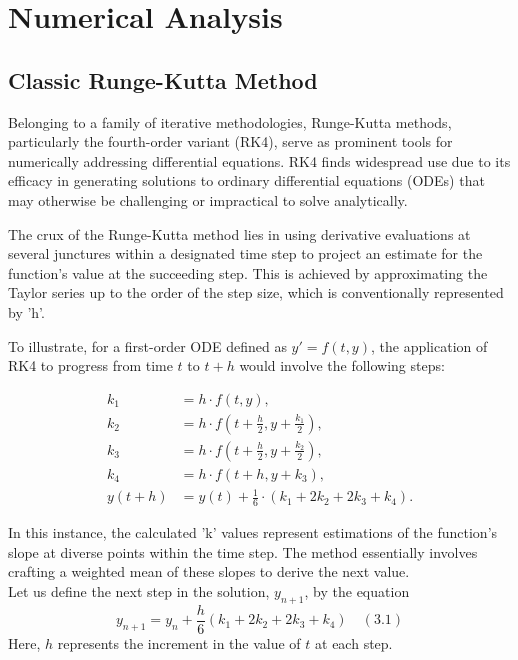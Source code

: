 \section{Numerical Analysis}
\subsection{Classic Runge-Kutta Method}

Belonging to a family of iterative methodologies, Runge-Kutta methods, particularly the fourth-order variant (RK4), serve as prominent tools for numerically addressing differential equations. RK4 finds widespread use due to its efficacy in generating solutions to ordinary differential equations (ODEs) that may otherwise be challenging or impractical to solve analytically.

The crux of the Runge-Kutta method lies in using derivative evaluations at several junctures within a designated time step to project an estimate for the function's value at the succeeding step. This is achieved by approximating the Taylor series up to the order of the step size, which is conventionally represented by 'h'.

To illustrate, for a first-order ODE defined as $y' = f(t, y)$, the application of RK4 to progress from time $t$ to $t + h$ would involve the following steps:

\begin{equation}
\begin{aligned}
k_1 &= h \cdot f(t, y), \\
k_2 &= h \cdot f(t + \frac{h}{2}, y + \frac{k_1}{2}), \\
k_3 &= h \cdot f(t + \frac{h}{2}, y + \frac{k_2}{2}), \\
k_4 &= h \cdot f(t + h, y + k_3), \\
y(t + h) &= y(t) + \frac{1}{6} \cdot (k_1 + 2k_2 + 2k_3 + k_4).
\end{aligned}
\end{equation}

In this instance, the calculated 'k' values represent estimations of the function's slope at diverse points within the time step. The method essentially involves crafting a weighted mean of these slopes to derive the next value.\\

Let us define the next step in the solution, $y_{n+1}$, by the equation
\begin{equation}
y_{n+1} = y_n + \frac{h}{6} (k_1 + 2k_2 + 2k_3 + k_4) \quad (3.1)
\end{equation}
Here, $h$ represents the increment in the value of $t$ at each step.

